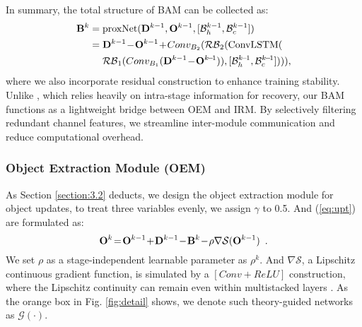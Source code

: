 \documentclass[10pt,journal,compsoc]{IEEEtran}
\begin{document}
In summary, the total structure of BAM can be collected as:
\begin{equation}
\setlength{\abovedisplayskip}{1pt}
\setlength{\belowdisplayskip}{1pt}
\centering
\begin{aligned}
\mathbf{B}^k & = \text{proxNet}(\mathbf{D}^{k-1},\mathbf{O}^{k-1},[\mathcal{B}^{k-1}_h,\mathcal{B}^{k-1}_c])\\
&= \mathbf{D}^{k-1}\!-\!\mathbf{O}^{k-1}\!+\!Conv_{B_2}(\mathcal{RB}_2(\text{ConvLSTM}(\\
&~~~~\mathcal{RB}_1(Conv_{B_1}(\mathbf{D}^{k-1}\!-\!\mathbf{O}^{k\!-\!1})), [\mathcal{B}^{k\!-\!1}_h, \mathcal{B}^{k\!-\!1}_c]))),
\end{aligned}
\label{eq:bam}
\end{equation}
where we also incorporate residual construction to enhance training stability. Unlike \cite{song-2021-madun}, which relies heavily on intra-stage information for recovery, our BAM functions as a lightweight bridge between OEM and IRM. By selectively filtering redundant channel features, we streamline inter-module communication and reduce computational overhead.


\subsubsection{Object Extraction Module (OEM)} 
As Section \ref{section:3.2} deducts, we design the object extraction module for object updates, to treat three variables evenly, we assign $\gamma$ to 0.5. And (\ref{eq:upt}) are formulated as:
\begin{equation}
\setlength{\abovedisplayskip}{2pt}
\setlength{\belowdisplayskip}{2pt}
{\mathbf{O}^k}\!=\!{\mathbf{O}^{k - 1}}\!+\!{\mathbf{D}^{k - 1}}\!-\!{\mathbf{B}^k}\!-\!{\rho}\nabla\mathcal{S}({\mathbf{O}^{k - 1}}) \enspace.
\label{eq:tnet}
\end{equation}
We set $\rho$ as a stage-independent learnable parameter as $\rho^{k}$. And $\nabla\mathcal{S}$, a Lipschitz continuous gradient function, is simulated by a $[Conv + ReLU]$ construction, where the Lipschitz continuity can remain even within multistacked layers \cite{virmaux-2018-lipschitz}. As the orange box in Fig. \ref{fig:detail} shows, we denote such theory-guided networks as $\mathcal{G}(\cdot)$.
\end{document}
